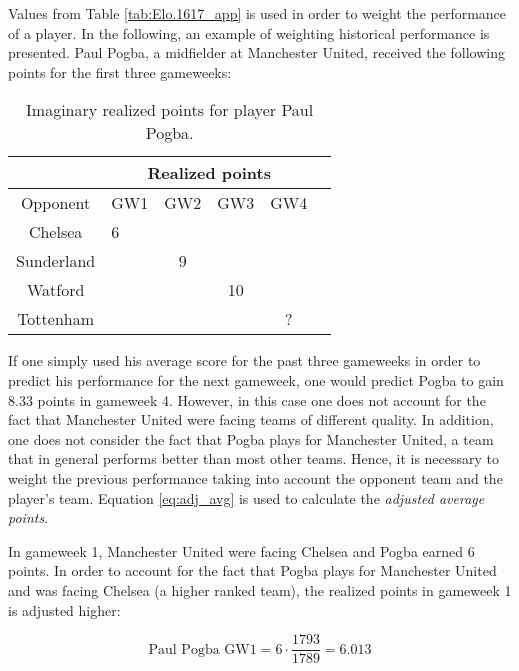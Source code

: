 Values from Table \ref{tab:Elo.1617_app} is used in order to weight the performance of a player. In the following, an example of weighting historical performance is presented. Paul Pogba, a midfielder at Manchester United, received the following points for the first three gameweeks: 


\begin{table}[H]
\centering
\begin{tabular}{|c|l|c|c|c|c|}
\hline
\multicolumn{1}{|c|}{} & \multicolumn{4}{c|}{Realized points} \\ \hline
Opponent               & GW1        & GW2       & GW3    & GW4   \\
\hline
Chelsea                & 6          &           &        &       \\
Sunderland             &            & 9         &        &       \\
Watford                &            &           & 10     &         \\
Tottenham              &            &           &        & ?      \\
\hline
\end{tabular}
\caption{Imaginary realized points for player Paul Pogba.}
\label{tab:appendix_paul_pogba_example}
\end{table}

If one simply used his average score for the past three gameweeks in order to predict his performance for the next gameweek, one would predict Pogba to gain 8.33 points in gameweek 4. However, in this case one does not account for the fact that Manchester United were facing teams of different quality. In addition, one does not consider the fact that Pogba plays for Manchester United, a team that in general performs better than most other teams. Hence, it is necessary to weight the previous performance taking into account the opponent team and the player's team. Equation \ref{eq:adj_avg} is used to calculate the \textit{adjusted average points}. 

\newpar

In gameweek 1, Manchester United were facing Chelsea and Pogba earned 6 points. In order to account for the fact that Pogba plays for Manchester United and was facing Chelsea (a higher ranked team), the realized points in gameweek 1 is adjusted higher:

\begin{equation*}
    \textrm{Paul Pogba GW1} = 6 \cdot \frac{1793}{1789} = 6.013 
\end{equation*}

